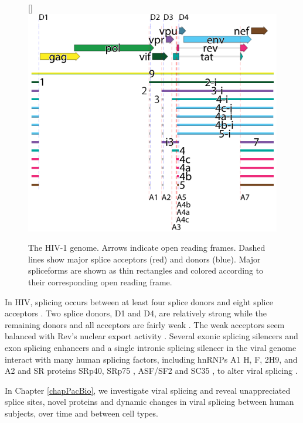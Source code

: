 \documentclass[../sherrill-Mix_thesis.tex]{subfiles}
\begin{document}
	\begin{figure}
		\centering
		[\FBwidth]{
			\includegraphics[width=.7\textwidth]{exonProt2.pdf}
		}{
			\caption[The HIV-1 genome]{The HIV-1 genome. Arrows indicate open reading frames. Dashed lines show major splice acceptors (red) and donors (blue). Major spliceforms are shown as thin rectangles and colored according to their corresponding open reading frame.}
			\label{figHIVGenome}
		}
	\end{figure}

	 In HIV, splicing occurs between at least four splice donors and eight splice acceptors \citep{Stoltzfus2009}. Two splice donors, D1 and D4, are relatively strong while the remaining donors and all acceptors are fairly weak \citep{O'Reilly1995}. The weak acceptors seem balanced with Rev's nuclear export activity \citep{Kammler2006}. Several exonic splicing silencers \citep{Amendt1994,Levengood2012} and exon splicing enhancers \citep{Caputi2004,Asang2008} and a single intronic splicing silencer \citep{Tange2001} in the viral genome interact with many human splicing factors, including hnRNPs A1 \citep{Tange2001, Levengood2012} H, F, 2H9, and A2 \citep{Jablonski2008} and SR proteins SRp40\citep{Caputi2004,Tranell2010}, SRp75 \citep{Tranell2010}, ASF/SF2 \citep{Caputi2004} and SC35 \citep{Jablonski2008}, to alter viral splicing \citep{Stoltzfus2006,Stoltzfus2009}.

	 In Chapter \ref{chapPacBio}, we investigate viral splicing and reveal unappreciated splice sites, novel proteins and dynamic changes in viral splicing between human subjects, over time and between cell types.
\end{document}
